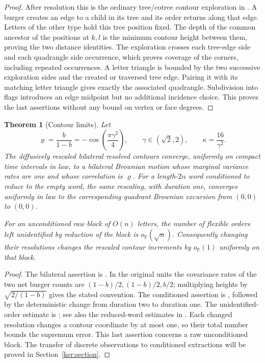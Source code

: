 \documentclass[11pt]{article}
\numberwithin{equation}{section}
\newtheorem{theorem}{Theorem}[section]
\theoremstyle{definition}
\theoremstyle{remark}
\newcommand{\PP}{\mathbb P}
\newcommand{\1}{\mathbf 1}
\begin{document}
\begin{proof}
After resolution this is the ordinary tree/cotree contour exploration
in \cite[Section 4.1, Figures 6--7]{SheffieldInventory}.  A burger
creates an edge to a child in its tree and its order returns along
that edge.  Letters of the other type hold this tree position fixed.
The depth of the common ancestor of the positions at $k,l$ is the
minimum contour height between them, proving the two distance
identities.  The exploration crosses each tree-edge side and each
quadrangle side occurrence, which proves coverage of the corners,
including repeated occurrences.  A letter triangle is bounded by the
two successive exploration sides and the created or traversed tree
edge.  Pairing it with its matching letter triangle gives exactly the
associated quadrangle.  Subdivision into flags introduces an edge
midpoint but no additional incidence choice.  This proves the last
assertions without any bound on vertex or face degrees.
\end{proof}

\begin{theorem}[Contour limits]\label{enc:contour-limits}
Let
\[
 \varrho=\frac b{1-b}=-\cos\left(\frac{\pi\gamma^2}{4}\right),
 \qquad \gamma\in(\sqrt2,2),\qquad \kappa=\frac{16}{\gamma^2}.
\]
The diffusively rescaled bilateral resolved contours converge, uniformly
on compact time intervals in law, to a bilateral Brownian motion whose
marginal variance rates are one and whose correlation is $\varrho$.
For a length-$2n$ word conditioned to reduce to the empty word, the same
rescaling, with duration one, converges uniformly in law to the corresponding
quadrant Brownian excursion from $(0,0)$ to $(0,0)$.

For an unconditioned raw block of $O(n)$ letters, the number of flexible
orders left unidentified by reduction of the block is $o_{\PP}(\sqrt n)$.
Consequently changing their resolutions changes the rescaled contour
increments by $o_{\PP}(1)$ uniformly on that block.
\end{theorem}

\begin{proof}
The bilateral assertion is \cite[Theorem 2.5]{SheffieldInventory}.
In the original units the covariance rates of the two net burger counts
are $(1-b)/2,(1-b)/2,b/2$; multiplying heights by
$\sqrt{2/(1-b)}$ gives the stated convention.  The conditioned assertion is
\cite[Theorem 1.8]{GwynneSunFKIII}, followed by the deterministic change
from duration two to duration one.  The unidentified-order estimate is
\cite[Remark 3.17]{SheffieldInventory}; see also the reduced-word estimates
in \cite{GwynneMaoSunFKI}.  Each changed resolution changes a contour
coordinate by at most one, so their total number bounds the supremum error.
This last assertion concerns a raw unconditioned block.  The transfer of
discrete observations to conditioned extractions will be proved in
Section~\ref{ker:section}.
\end{proof}
\end{document}
